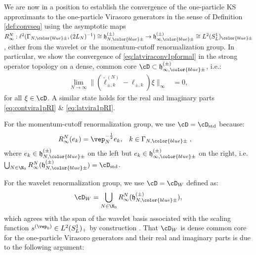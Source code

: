 \documentclass[a4paper, 11pt]{article}
\newcommand{\fh}{\mathfrak{h}}
\newcommand{\ltwo}{\ell^{2}}
\DeclareMathOperator{\1}{\mathds{1}}
\DeclareMathOperator{\std}{std}
\begin{document}
We are now in a position to establish the convergence of the one-particle KS approximants to the one-particle Virasoro generators in the sense of Definition \ref{def:convseq} using the asymptotic maps $R^{N}_{\infty}:\ltwo(\Gamma_{N,{\color{blue}\pm}},(2L_{N})^{-1})\cong\fh^{(\pm)}_{N,{\color{blue}\pm}}\rightarrow\fh^{(\pm)}_{\infty,{\color{blue}\pm}}\cong L^{2}(S^{1}_{L})_{{\color{blue}\pm}}$, either from the wavelet or the momentum-cutoff renormalization group. In particular, we show the convergence of \eqref{eq:latviraconv1pformal} in the strong operator topology on a dense, common core $\cD\subset\fh^{(\pm)}_{\infty,{\color{blue}\pm}}$, i.e.:
\begin{align}
\label{eq:latviraconv1p}
\lim_{N\rightarrow\infty}\|(\tilde{\ell}^{(N)}_{\pm,k} - \ell_{\pm,k})\xi\|_{\infty} & = 0,
\end{align}
for all $\xi\in\cD$. A similar state holds for the real and imaginary parts \eqref{eq:contvira1pRI} \& \eqref{eq:latvira1pRI}.

\medskip

For the momentum-cutoff renormalization group, we use $\cD=\cD_{\std}$ because:
\begin{align}
\label{eq:momdominv}
R^{N}_{\infty}(e_{k}) & = \vep_{N}^{-\frac{1}{2}}e_{k}, & k&\in\Gamma_{N,{\color{blue}\pm}}\;,
\end{align}
where $e_{k}\in\fh^{(\pm)}_{N,{\color{blue}\pm}}$ on the left but $e_{k}\in\fh^{(\pm)}_{\infty,{\color{blue}\pm}}$ on the right, i.e.~$\bigcup_{N\in\N_{0}}R^{N}_{\infty}(\fh^{(\pm)}_{N,{\color{blue}\pm}})=\cD_{\std}$.

\medskip

For the wavelet renormalization group, we use $\cD=\cD_{W}$ defined as:
\begin{align}
\label{eq:waveletdom}
\cD_{W} = \bigcup_{N\in\N_{0}}R^{N}_{\infty}(\fh^{(\pm)}_{N,{\color{blue}\pm}}),
\end{align}
which agrees with the span of the wavelet basis associated with the scaling function $s^{(\vep_{0})}\in L^{2}(S^{1}_{L})_{+}$ by construction \cite{DaubechiesTenLecturesOn}. That $\cD_{W}$ is dense common core for the one-particle Virasoro generators and their real and imaginary parts is due to the following argument: 
\end{document}
